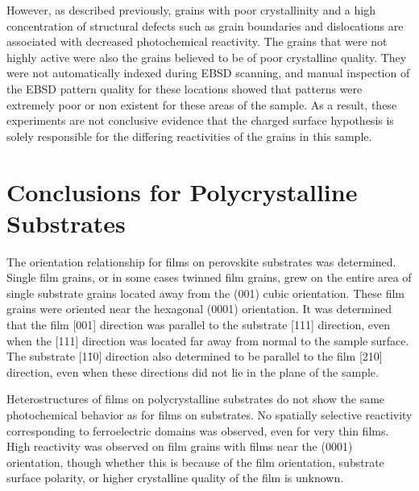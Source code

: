 However, as described previously, grains with poor crystallinity and a high concentration of structural defects such as grain boundaries and dislocations are associated with decreased photochemical reactivity. The grains that were not highly active were also the grains believed to be of poor crystalline quality. They were not automatically indexed during EBSD scanning, and manual inspection of the EBSD pattern quality for these locations showed that patterns were extremely poor or non existent for these areas of the sample. As a result, these experiments are not conclusive evidence that the charged surface hypothesis is solely responsible for the differing reactivities of the grains in this sample. 


\section{Conclusions for Polycrystalline Substrates}
\label{sec:ch6conclusions}


The orientation relationship for  films on perovskite  substrates was determined. Single film grains, or in some cases twinned film grains, grew on the entire area of single substrate grains located away from the (001) cubic orientation. These film grains were oriented near the hexagonal (0001) orientation. It was determined that the film [001] direction was parallel to the substrate [111] direction, even when the [111] direction was located far away from normal to the sample surface. The substrate [1\={1}0] direction also determined to be parallel to the film [210] direction, even when these directions did not lie in the plane of the sample. 

Heterostructures of  films on polycrystalline  substrates do not show the same photochemical behavior as for  films on  substrates. No spatially selective reactivity corresponding to ferroelectric domains was observed, even for very thin films. High reactivity was observed on film grains with films near the (0001) orientation, though whether this is because of the film orientation, substrate surface polarity, or higher crystalline quality of the film is unknown.